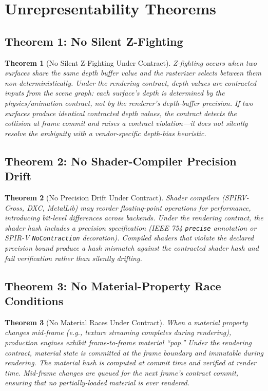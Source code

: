 \documentclass[sigconf,nonacm]{acmart}
\newtheorem{theorem}{Theorem}
\begin{document}
\section{Unrepresentability Theorems}
\label{sec:unrep}

\subsection{Theorem 1: No Silent Z-Fighting}
\begin{theorem}[No Silent Z-Fighting Under Contract]
Z-fighting occurs when two surfaces share the same depth buffer
value and the rasterizer selects between them
non-deterministically. Under the rendering contract, depth
values are contracted inputs from the scene graph: each
surface's depth is determined by the physics/animation
contract, not by the renderer's depth-buffer precision. If
two surfaces produce identical contracted depth values, the
contract detects the collision at frame commit and raises a
contract violation---it does not silently resolve the
ambiguity with a vendor-specific depth-bias heuristic.
\end{theorem}

\subsection{Theorem 2: No Shader-Compiler Precision Drift}
\begin{theorem}[No Precision Drift Under Contract]
Shader compilers (SPIRV-Cross, DXC, MetalLib) may reorder
floating-point operations for performance, introducing
bit-level differences across backends. Under the rendering
contract, the shader hash includes a precision specification
(IEEE 754 \texttt{precise} annotation or SPIR-V
\texttt{NoContraction} decoration). Compiled shaders that
violate the declared precision bound produce a hash mismatch
against the contracted shader hash and fail verification
rather than silently drifting.
\end{theorem}

\subsection{Theorem 3: No Material-Property Race Conditions}
\begin{theorem}[No Material Races Under Contract]
When a material property changes mid-frame (e.g., texture
streaming completes during rendering), production engines
exhibit frame-to-frame material ``pop.'' Under the rendering
contract, material state is committed at the frame boundary
and immutable during rendering. The material hash is computed
at commit time and verified at render time. Mid-frame changes
are queued for the next frame's contract commit, ensuring that
no partially-loaded material is ever rendered.
\end{theorem}
\end{document}
